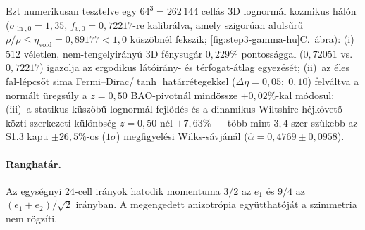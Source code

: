 \documentclass[11pt,a4paper]{article}
\begin{document}
Ezt numerikusan tesztelve egy $64^3 = 262\,144$ cellás 3D lognormál kozmikus hálón ($\sigma_{\ln,0} = 1{,}35$, $f_{v,0} = 0{,}72217$-re kalibrálva, amely szigorúan alulsűrű $\rho/\bar{\rho} \le \eta_{\mathrm{void}} = 0{,}89177 < 1{,}0$ küszöbnél fekszik; \ref{fig:step3-gamma-hu}C.~ábra):
(i)~$512$ véletlen, nem-tengelyirányú 3D fénysugár $0{,}229\%$ pontossággal ($0{,}72051$ vs.\ $0{,}72217$) igazolja az ergodikus látóirány- és térfogat-átlag egyezését;
(ii)~az éles fal-lépcsőt sima Fermi--Dirac/$\tanh$ határrétegekkel ($\Delta\eta = 0{,}05;\; 0{,}10$) felváltva a normált üregsúly a $z = 0{,}50$ BAO-pivotnál mindössze $+0{,}02\%$-kal módosul;
(iii)~a statikus küszöbű lognormál fejlődés és a dinamikus Wiltshire-héjkövető közti szerkezeti különbség $z = 0{,}50$-nél $+7{,}63\%$ --- több mint $3{,}4$-szer szűkebb az S1.3 kapu $\pm 26{,}5\%$-os ($1\sigma$) megfigyelési Wilks-sávjánál ($\hat{\alpha} = 0{,}4769 \pm 0{,}0958$).

\paragraph{Ranghatár.} Az egységnyi 24-cell irányok hatodik momentuma $3/2$ az $e_1$ és $9/4$ az $(e_1+e_2)/\sqrt2$ irányban. A megengedett anizotrópia együtthatóját a szimmetria nem rögzíti.
\end{document}
